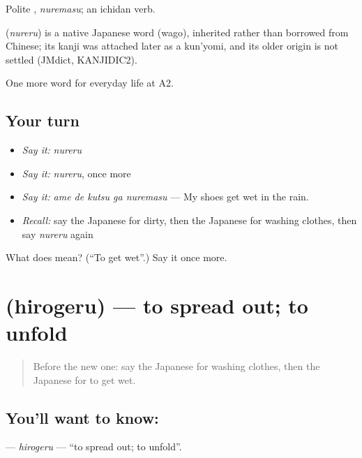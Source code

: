 Polite \textbf{}, \emph{nuremasu}; an ichidan verb.

\begin{cousinweb}
\textbf{} (\emph{nureru}) is a native Japanese word (wago), inherited rather than borrowed from Chinese; its kanji was attached later as a kun'yomi, and its older origin is not settled (JMdict, KANJIDIC2).
\end{cousinweb}

\begin{grammarlens}[title={What you've built}]
One more word for everyday life at A2.
\end{grammarlens}

\subsection*{Your turn}
\begin{itemize}
\raggedright
  \item \emph{Say it:} \emph{nureru}
  \item \emph{Say it:} \emph{nureru}, once more
  \item \emph{Say it:} \emph{ame de kutsu ga nuremasu} — My shoes get wet in the rain.
  \item \emph{Recall:} say the Japanese for dirty, then the Japanese for washing clothes, then say \emph{nureru} again
\end{itemize}

\begin{tcolorbox}[breakable,colback=teal!4,colframe=teal!35!black,title={Before you move on}]
What does  mean? (\textquotedblleft{}To get wet\textquotedblright{}.) Say it once more.
\end{tcolorbox}
\section[\texorpdfstring{\ja{ひろげる} (hirogeru)}{ひろげる (hirogeru)}]{ (hirogeru) — to spread out; to unfold}

\label{lesson:JA-C161-hirogeru}



\begin{quote}
Before the new one: say the Japanese for washing clothes, then the Japanese for to get wet.
\end{quote}

\subsection*{You'll want to know: }
\textbf{} — \emph{hirogeru} — \textquotedblleft{}to spread out; to unfold\textquotedblright{}.

